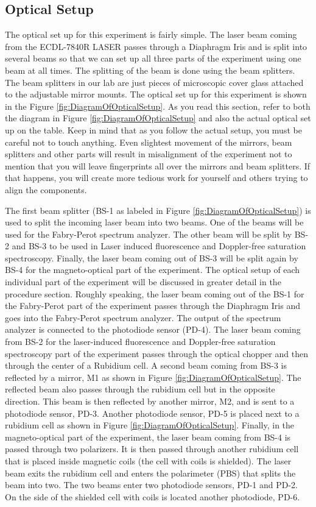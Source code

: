 \documentclass{../lab}
\begin{document}
\subsection{Optical Setup}

The optical set up for this experiment is fairly simple. The laser beam coming from the ECDL-7840R LASER passes through a Diaphragm Iris and is split into several beams so that we can set up all three parts of the experiment using one beam at all times. The splitting of the beam is done using the beam splitters. The beam splitters in our lab are just pieces of microscopic cover glass attached to the adjustable mirror mounts. The optical set up for this experiment is shown in the Figure \ref{fig:DiagramOfOpticalSetup}. As you read this section, refer to both the diagram in Figure \ref{fig:DiagramOfOpticalSetup} and also the actual optical set up on the table. Keep in mind that as you follow the actual setup, you must be careful not to touch anything. Even slightest movement of the mirrors, beam splitters and other parts will result in misalignment of the experiment not to mention that you will leave fingerprints all over the mirrors and beam splitters. If that happens, you will create more tedious work for yourself and others trying to align the components.

\newpage

The first beam splitter (BS-1 as labeled in Figure \ref{fig:DiagramOfOpticalSetup}) is used to split the incoming laser beam into two beams. One of the beams will be used for the Fabry-Perot spectrum analyzer. The other beam will be split by BS-2 and BS-3 to be used in Laser induced fluorescence and Doppler-free saturation spectroscopy. Finally, the laser beam coming out of BS-3 will be split again by BS-4 for the magneto-optical part of the experiment. The optical setup of each individual part of the experiment will be discussed in greater detail in the procedure section. Roughly speaking, the laser beam coming out of the BS-1 for the Fabry-Perot part of the experiment passes through the Diaphragm Iris and goes into the Fabry-Perot spectrum analyzer. The output of the spectrum analyzer is connected to the photodiode sensor (PD-4). The laser beam coming from BS-2 for the laser-induced fluorescence and Doppler-free saturation spectroscopy part of the experiment passes through the optical chopper and then through the center of a Rubidium cell. A second beam coming from BS-3 is reflected by a mirror, M1 as shown in Figure \ref{fig:DiagramOfOpticalSetup}. The reflected beam also passes through the rubidium cell but in the opposite direction. This beam is then reflected by another mirror, M2, and is sent to a photodiode sensor, PD-3. Another photodiode sensor, PD-5 is placed next to a rubidium cell as shown in Figure \ref{fig:DiagramOfOpticalSetup}. Finally, in the magneto-optical part of the experiment, the laser beam coming from BS-4 is passed through two polarizers. It is then passed through another rubidium cell that is placed inside magnetic coils (the cell with coils is shielded). The laser beam exits the rubidium cell and enters the polarimeter (PBS) that splits the beam into two. The two beams enter two photodiode sensors, PD-1 and PD-2. On the side of the shielded cell with coils is located another photodiode, PD-6.
\end{document}
